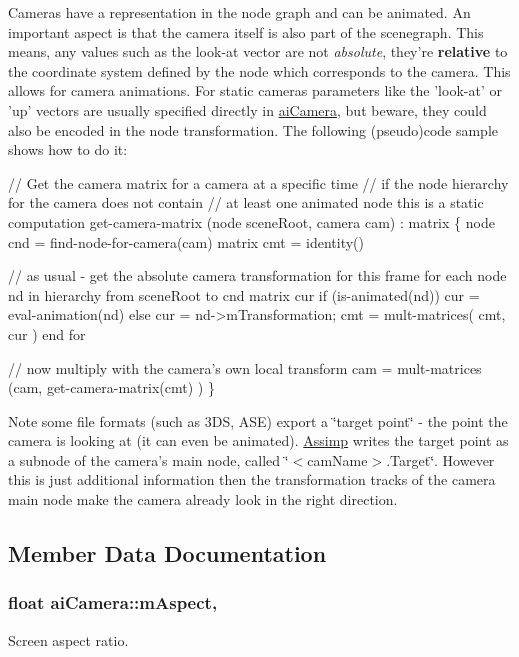 Cameras have a representation in the node graph and can be animated. An important aspect is that the camera itself is also part of the scenegraph. This means, any values such as the look-\/at vector are not {\itshape absolute}, they're {\bfseries relative} to the coordinate system defined by the node which corresponds to the camera. This allows for camera animations. For static cameras parameters like the 'look-\/at' or 'up' vectors are usually specified directly in \hyperlink{structai_camera}{ai\+Camera}, but beware, they could also be encoded in the node transformation. The following (pseudo)code sample shows how to do it\+: ~\newline
~\newline
 
\begin{DoxyCode}
\textcolor{comment}{// Get the camera matrix for a camera at a specific time}
\textcolor{comment}{// if the node hierarchy for the camera does not contain}
\textcolor{comment}{// at least one animated node this is a static computation}
\textcolor{keyword}{get}-camera-matrix (node sceneRoot, camera cam) : matrix
\{
   node   cnd = find-node-\textcolor{keywordflow}{for}-camera(cam)
   matrix cmt = identity()

   \textcolor{comment}{// as usual - get the absolute camera transformation for this frame}
   for each node nd in hierarchy from sceneRoot to cnd
     matrix cur
     if (is-animated(nd))
        cur = eval-animation(nd)
     else cur = nd->mTransformation;
     cmt = mult-matrices( cmt, cur )
   end for

   \textcolor{comment}{// now multiply with the camera's own local transform}
   cam = mult-matrices (cam, get-camera-matrix(cmt) )
\}
\end{DoxyCode}


\begin{DoxyNote}{Note}
some file formats (such as 3\+D\+S, A\+S\+E) export a \char`\"{}target point\char`\"{} -\/ the point the camera is looking at (it can even be animated). \hyperlink{class_assimp}{Assimp} writes the target point as a subnode of the camera's main node, called \char`\"{}$<$cam\+Name$>$.\+Target\char`\"{}. However this is just additional information then the transformation tracks of the camera main node make the camera already look in the right direction. 
\end{DoxyNote}


\subsection{Member Data Documentation}
\hypertarget{structai_camera_ae414556eaa6f910b5927f465d97bf70c}{
\subsubsection[{m\+Aspect}]{\setlength{\rightskip}{0pt plus 5cm}float ai\+Camera\+::m\+Aspect\hspace{0.3cm}{\ttfamily [get]}, {\ttfamily [set]}}}\label{structai_camera_ae414556eaa6f910b5927f465d97bf70c}
Screen aspect ratio.

